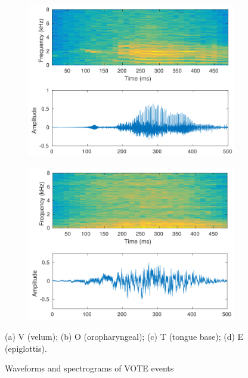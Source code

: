 \begin{figure}[h]
\begin{subfigure}{.4\textwidth}
		\caption{}
		\label{fig:O}
	\end{subfigure}
	\begin{subfigure}{.4\textwidth}
		\includegraphics[width=\linewidth]{img/T_spec_crop.pdf}
		\caption{}
		\label{fig:T}
	\end{subfigure}
	\begin{subfigure}{.4\textwidth}
		\includegraphics[width=\linewidth]{img/E_spec_crop.pdf}
		\caption{}
		\label{fig:E}
	\end{subfigure}
	\caption[Spectrograms of VOTE Sounds]{Waveforms and spectrograms of VOTE events}{(a) V (velum); (b) O (oropharyngeal); (c) T (tongue base); (d) E (epiglottis).}
	\label{fig:vote_spectrograms}
\end{figure}


